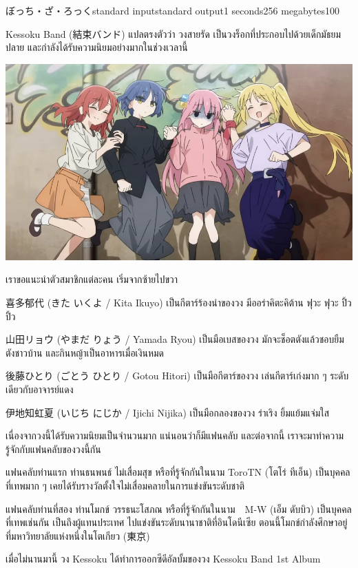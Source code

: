 \documentclass[11pt,a4paper]{article}
\begin{document}
\begin{problem}{ぼっち・ざ・ろっく}{standard input}{standard output}{1 seconds}{256 megabytes}{100}

Kessoku Band (結束バンド) แปลตรงตัวว่า วงสายรัด เป็นวงร็อกที่ประกอบไปด้วยเด็กมัธยมปลาย และกำลังได้รับความนิยมอย่างมากในช่วงเวลานี้

\includegraphics[width=\textwidth]{04-bocchitherock/kessokuband.png}

เราขอแนะนำตัวสมาชิกแต่ละคน เริ่มจากซ้ายไปขวา

喜多郁代 (きた いくよ / Kita Ikuyo) เป็นกีตาร์ร้องนำของวง มีออร่าคิตะคิต้าน ฟุวะ ฟุวะ ปิ้ว ปิ้ว

山田リョウ (やまだ りょう / Yamada Ryou) เป็นมือเบสของวง มักจะช็อตตังแล้วชอบยืมตังชาวบ้าน และกินหญ้าเป็นอาหารเมื่อเงินหมด

後藤ひとり (ごとう ひとり / Gotou Hitori) เป็นมือกีตาร์ของวง เล่นกีตาร์เก่งมาก ๆ ระดับเดียวกับอาจารย์แดง

伊地知虹夏 (いじち にじか / Ijichi Nijika) เป็นมือกลองของวง ร่าเริง ยิ้มแย้มแจ่มใส

เนื่องจากวงนี้ได้รับความนิยมเป็นจำนวนมาก แน่นอนว่าก็มีแฟนคลับ และต่อจากนี้ เราจะมาทำความรู้จักกับแฟนคลับของวงนี้กัน

แฟนคลับท่านแรก ท่านธนพนธ์ ไม่เสื่อมสุข หรือที่รู้จักกันในนาม ToroTN (โตโร่ ทีเอ็น) เป็นบุคคลที่เทพมาก ๆ เคยได้รับรางวัลตั้งใจไม่เสื่อมคลายในการแข่งขันระดับชาติ

แฟนคลับท่านที่สอง ท่านโมกข์ วรรธนะโสภณ หรือที่รู้จักกันในนาม　M-W (เอ็ม ดับบิว) เป็นบุคคลที่เทพเช่นกัน เป็นถึงผู้แทนประเทศ ไปแข่งขันระดับนานาชาติที่อินโดนีเซีย ตอนนี้โมกข์กำลังศึกษาอยู่ที่มหาวิทยาลัยแห่งหนึ่งในโตเกียว (東京)

\pagebreak

เมื่อไม่นานมานี้ วง Kessoku ได้ทำการออกซีดีอัลบั้มของวง Kessoku Band 1st Album


\end{problem}
\end{document}
